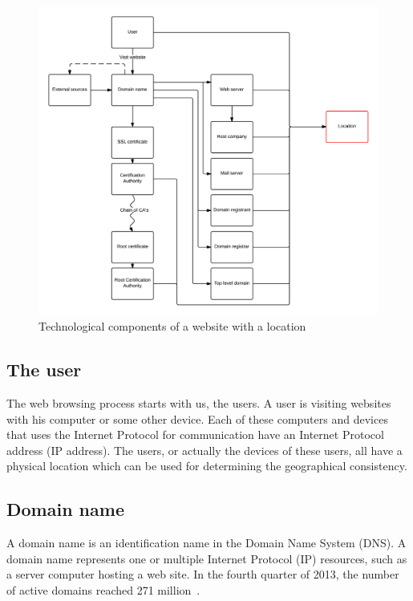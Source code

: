 \documentclass[twoside,openright,notitlepage]{uva-bachelor-thesis}
\begin{document}
\begin{figure}[h!]
    \centering
    \includegraphics[width=1.2\textwidth, center]{img/components_new_empty.png}
    \caption{Technological components of a website with a location}
    \label{fig:components}
\end{figure}

\subsection{The user}
The web browsing process starts with us, the users. A user is visiting websites with his computer or some other device. Each of these computers and devices that uses the Internet Protocol for communication have an Internet Protocol address (IP address). The users, or actually the devices of these users, all have a physical location which can be used for determining the geographical consistency.

\subsection{Domain name}
A domain name is an identification name in the Domain Name System (DNS).
A domain name represents one or multiple Internet Protocol (IP) resources, such as a server computer hosting a web site. In the fourth quarter of 2013, the number of active domains reached 271 million~\cite{verisign}.\\
\end{document}
